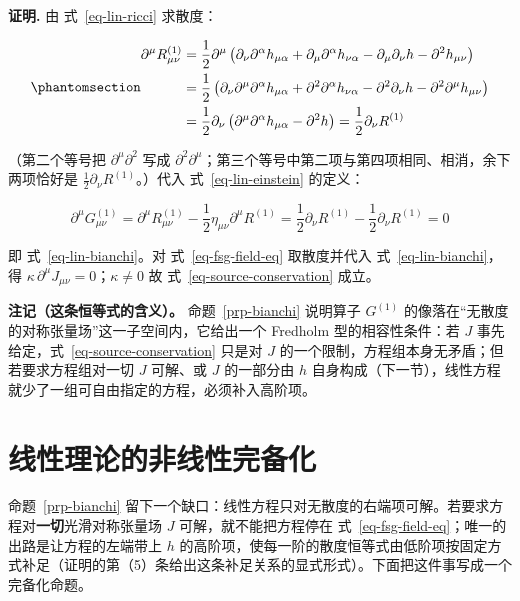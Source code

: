 \documentclass[
  chinese,
  a4paper,
  UTF8,
  12pt,
  oneside,
  openany]{ctexbook}
\theoremstyle{plain}
\theoremstyle{plain}
\theoremstyle{plain}
\theoremstyle{definition}
\theoremstyle{plain}
\theoremstyle{plain}
\theoremstyle{remark}
\begin{document}
\textbf{证明.} 由 式~\ref{eq-lin-ricci} 求散度：

\begin{equation}\protect\phantomsection\label{eq-ricci-divergence}{
\begin{aligned}
\partial^{\mu}R^{(1)}_{\mu\nu}
&=\frac{1}{2}\partial^{\mu}\left(
\partial_{\nu}\partial^{\alpha}h_{\mu\alpha}
+\partial_{\mu}\partial^{\alpha}h_{\nu\alpha}
-\partial_{\mu}\partial_{\nu}h
-\partial^{2}h_{\mu\nu}
\right)\\
&=\frac{1}{2}\left(
\partial_{\nu}\partial^{\mu}\partial^{\alpha}h_{\mu\alpha}
+\partial^{2}\partial^{\alpha}h_{\nu\alpha}
-\partial^{2}\partial_{\nu}h
-\partial^{2}\partial^{\mu}h_{\mu\nu}
\right)\\
&=\frac{1}{2}\partial_{\nu}\left(\partial^{\mu}\partial^{\alpha}h_{\mu\alpha}-\partial^{2}h\right)
=\frac{1}{2}\partial_{\nu}R^{(1)}
\end{aligned}
}\end{equation}

（第二个等号把 \(\partial^{\mu}\partial^{2}\) 写成
\(\partial^{2}\partial^{\mu}\)；第三个等号中第二项与第四项相同、相消，余下两项恰好是
\(\frac{1}{2}\partial_{\nu}R^{(1)}\)。）代入 式~\ref{eq-lin-einstein}
的定义：

\[
\partial^{\mu}G^{(1)}_{\mu\nu}
=\partial^{\mu}R^{(1)}_{\mu\nu}-\frac{1}{2}\eta_{\mu\nu}\partial^{\mu}R^{(1)}
=\frac{1}{2}\partial_{\nu}R^{(1)}-\frac{1}{2}\partial_{\nu}R^{(1)}
=0
\]

即 式~\ref{eq-lin-bianchi}。对 式~\ref{eq-fsg-field-eq} 取散度并代入
式~\ref{eq-lin-bianchi}，得
\(\kappa\,\partial^{\mu}J_{\mu\nu}=0\)；\(\kappa\neq0\) 故
式~\ref{eq-source-conservation} 成立。

\textbf{注记（这条恒等式的含义）。} 命题~\ref{prp-bianchi} 说明算子
\(G^{(1)}\) 的像落在``无散度的对称张量场''这一子空间内，它给出一个
Fredholm 型的相容性条件：若 \(J\)
事先给定，式~\ref{eq-source-conservation} 只是对 \(J\)
的一个限制，方程组本身无矛盾；但若要求方程组对一切 \(J\) 可解、或 \(J\)
的一部分由 \(h\)
自身构成（下一节），线性方程就少了一组可自由指定的方程，必须补入高阶项。

\section{线性理论的非线性完备化}\label{sec-fsg-bootstrap}

命题~\ref{prp-bianchi}
留下一个缺口：线性方程只对无散度的右端项可解。若要求方程对\textbf{一切}光滑对称张量场
\(J\) 可解，就不能把方程停在
式~\ref{eq-fsg-field-eq}；唯一的出路是让方程的左端带上 \(h\)
的高阶项，使每一阶的散度恒等式由低阶项按固定方式补足（证明的第（5）条给出这条补足关系的显式形式）。下面把这件事写成一个完备化命题。
\end{document}
